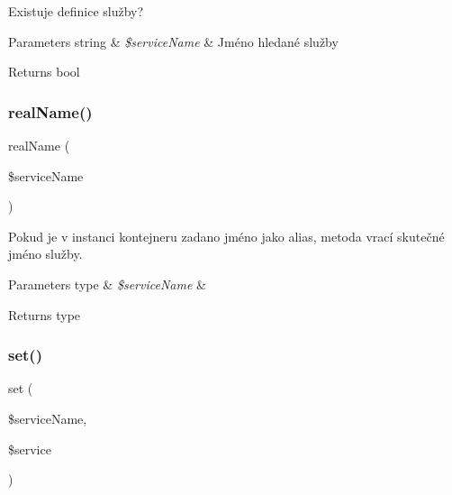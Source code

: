 Existuje definice služby?


\begin{DoxyParams}[1]{Parameters}
string & {\em \$service\+Name} & Jméno hledané služby \\
\hline
\end{DoxyParams}
\begin{DoxyReturn}{Returns}
bool 
\end{DoxyReturn}
\mbox{\label{class_pes_1_1_container_1_1_container_a48a6a65b0ccc5284dd7c87ca496f3f3d}} 
\subsubsection{\texorpdfstring{real\+Name()}{realName()}}
{\footnotesize\ttfamily real\+Name (\begin{DoxyParamCaption}\item[{}]{\$service\+Name }\end{DoxyParamCaption})\hspace{0.3cm}{\ttfamily [protected]}}

Pokud je v instanci kontejneru zadano jméno jako alias, metoda vrací skutečné jméno služby.


\begin{DoxyParams}[1]{Parameters}
type & {\em \$service\+Name} & \\
\hline
\end{DoxyParams}
\begin{DoxyReturn}{Returns}
type 
\end{DoxyReturn}
\mbox{\label{class_pes_1_1_container_1_1_container_a0a6f88d94e8821447a2e233146b18344}} 
\subsubsection{\texorpdfstring{set()}{set()}}
{\footnotesize\ttfamily set (\begin{DoxyParamCaption}\item[{}]{\$service\+Name,  }\item[{}]{\$service }\end{DoxyParamCaption})}

